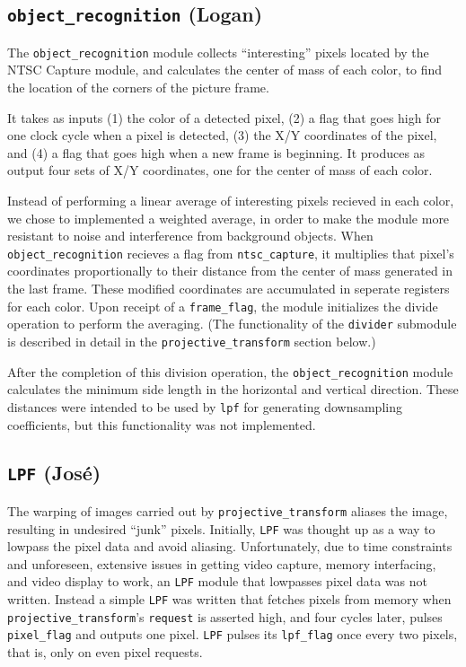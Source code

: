 \documentclass[10pt]{article}
\begin{document}
\subsection{{\tt object\_recognition} (Logan)}
The {\tt object\_recognition} module collects ``interesting'' pixels located by the NTSC Capture module, and calculates the center of mass of each color, to find the location of the corners of the picture frame.

It takes as inputs (1) the color of a detected pixel, (2) a flag that goes high for one clock cycle when a pixel is detected, (3) the X/Y coordinates of the pixel, and (4) a flag that goes high when a new frame is beginning. It produces as output four sets of X/Y coordinates, one for the center of mass of each color.

Instead of performing a linear average of interesting pixels recieved in each color, we chose to implemented a weighted average, in order to make the module more resistant to noise and interference from background objects. When {\tt object\_recognition} recieves a flag from {\tt ntsc\_capture}, it multiplies that pixel's coordinates proportionally to their distance from the center of mass generated in the last frame. These modified coordinates are accumulated in seperate registers for each color. Upon receipt of a {\tt frame\_flag}, the module initializes the divide operation to perform the averaging. (The functionality of the {\tt divider} submodule is described in detail in the {\tt projective\_transform} section below.)

After the completion of this division operation, the {\tt object\_recognition} module calculates the minimum side length in the horizontal and vertical direction. These distances were intended to be used by {\tt lpf} for generating downsampling coefficients, but this functionality was not implemented.

\subsection{{\tt LPF} (Jos\'{e})}
The warping of images carried out by {\tt projective\_transform} aliases the image, resulting in undesired ``junk'' pixels. Initially, {\tt LPF} was thought up as a way to lowpass the pixel data and avoid aliasing. Unfortunately, due to time constraints and unforeseen, extensive issues in getting video capture, memory interfacing, and video display to work, an {\tt LPF} module that lowpasses pixel data was not written. Instead a simple {\tt LPF} was written that fetches pixels from memory when {\tt projective\_transform}'s {\tt request} is asserted high, and four cycles later, pulses {\tt pixel\_flag} and outputs one pixel. {\tt LPF} pulses its {\tt lpf\_flag} once every two pixels, that is, only on even pixel requests.
\end{document}
